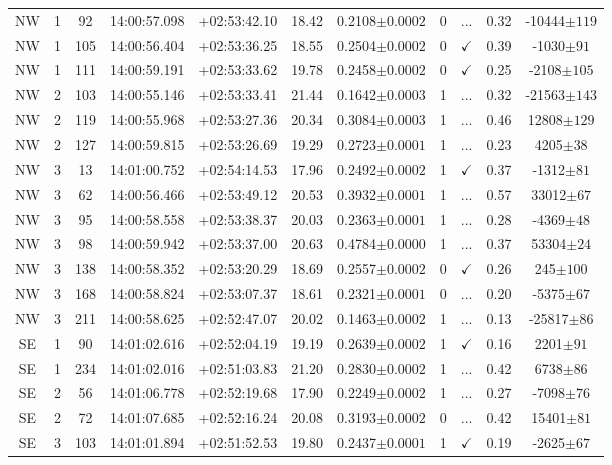 \begin{table*}
\begin{tabular}{ccccccccccc}
NW & 1 & 92 & 14:00:57.098 & +02:53:42.10 & 18.42 & 0.2108$\pm{0.0002}$ & 0 & ... & 0.32 & -10444$\pm{119}$ \\
NW & 1 & 105 & 14:00:56.404 & +02:53:36.25 & 18.55 & 0.2504$\pm{0.0002}$ & 0 & $\checkmark$ & 0.39 & -1030$\pm{91}$ \\
NW & 1 & 111 & 14:00:59.191 & +02:53:33.62 & 19.78 & 0.2458$\pm{0.0002}$ & 0 & $\checkmark$ & 0.25 & -2108$\pm{105}$ \\
NW & 2 & 103 & 14:00:55.146 & +02:53:33.41 & 21.44 & 0.1642$\pm{0.0003}$ & 1 & ... & 0.32 & -21563$\pm{143}$ \\
NW & 2 & 119 & 14:00:55.968 & +02:53:27.36 & 20.34 & 0.3084$\pm{0.0003}$ & 1 & ... & 0.46 & 12808$\pm{129}$ \\
NW & 2 & 127 & 14:00:59.815 & +02:53:26.69 & 19.29 & 0.2723$\pm{0.0001}$ & 1 & ... & 0.23 & 4205$\pm{38}$ \\
NW & 3 & 13 & 14:01:00.752 & +02:54:14.53 & 17.96 & 0.2492$\pm{0.0002}$ & 1 & $\checkmark$ & 0.37 & -1312$\pm{81}$ \\
NW & 3 & 62 & 14:00:56.466 & +02:53:49.12 & 20.53 & 0.3932$\pm{0.0001}$ & 1 & ... & 0.57 & 33012$\pm{67}$ \\
NW & 3 & 95 & 14:00:58.558 & +02:53:38.37 & 20.03 & 0.2363$\pm{0.0001}$ & 1 & ... & 0.28 & -4369$\pm{48}$ \\
NW & 3 & 98 & 14:00:59.942 & +02:53:37.00 & 20.63 & 0.4784$\pm{0.0000}$ & 1 & ... & 0.37 & 53304$\pm{24}$ \\
NW & 3 & 138 & 14:00:58.352 & +02:53:20.29 & 18.69 & 0.2557$\pm{0.0002}$ & 0 & $\checkmark$ & 0.26 & 245$\pm{100}$ \\
NW & 3 & 168 & 14:00:58.824 & +02:53:07.37 & 18.61 & 0.2321$\pm{0.0001}$ & 0 & ... & 0.20 & -5375$\pm{67}$ \\
NW & 3 & 211 & 14:00:58.625 & +02:52:47.07 & 20.02 & 0.1463$\pm{0.0002}$ & 1 & ... & 0.13 & -25817$\pm{86}$ \\
SE & 1 & 90 & 14:01:02.616 & +02:52:04.19 & 19.19 & 0.2639$\pm{0.0002}$ & 1 & $\checkmark$ & 0.16 & 2201$\pm{91}$ \\
SE & 1 & 234 & 14:01:02.016 & +02:51:03.83 & 21.20 & 0.2830$\pm{0.0002}$ & 1 & ... & 0.42 & 6738$\pm{86}$ \\
SE & 2 & 56 & 14:01:06.778 & +02:52:19.68 & 17.90 & 0.2249$\pm{0.0002}$ & 1 & ... & 0.27 & -7098$\pm{76}$ \\
SE & 2 & 72 & 14:01:07.685 & +02:52:16.24 & 20.08 & 0.3193$\pm{0.0002}$ & 0 & ... & 0.42 & 15401$\pm{81}$ \\
SE & 3 & 103 & 14:01:01.894 & +02:51:52.53 & 19.80 & 0.2437$\pm{0.0001}$ & 1 & $\checkmark$ & 0.19 & -2625$\pm{67}$ \\

\end{tabular}
\end{table*}
